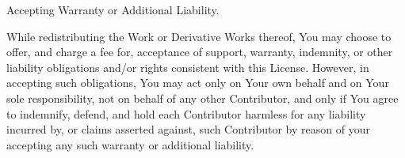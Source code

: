 \begin{DoxyEnumerate}
\item Accepting Warranty or Additional Liability.
\end{DoxyEnumerate}

While redistributing the Work or Derivative Works thereof, You may choose to offer, and charge a fee for, acceptance of support, warranty, indemnity, or other liability obligations and/or rights consistent with this License. However, in accepting such obligations, You may act only on Your own behalf and on Your sole responsibility, not on behalf of any other Contributor, and only if You agree to indemnify, defend, and hold each Contributor harmless for any liability incurred by, or claims asserted against, such Contributor by reason of your accepting any such warranty or additional liability. 